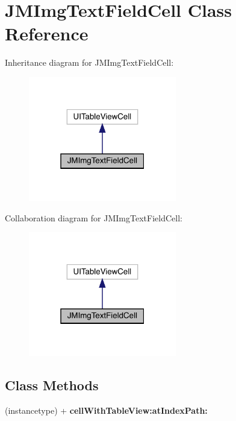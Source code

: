 \hypertarget{interface_j_m_img_text_field_cell}{}\section{J\+M\+Img\+Text\+Field\+Cell Class Reference}
\label{interface_j_m_img_text_field_cell}


Inheritance diagram for J\+M\+Img\+Text\+Field\+Cell\+:\nopagebreak
\begin{figure}[H]
\begin{center}
\leavevmode
\includegraphics[width=183pt]{interface_j_m_img_text_field_cell__inherit__graph}
\end{center}
\end{figure}


Collaboration diagram for J\+M\+Img\+Text\+Field\+Cell\+:\nopagebreak
\begin{figure}[H]
\begin{center}
\leavevmode
\includegraphics[width=183pt]{interface_j_m_img_text_field_cell__coll__graph}
\end{center}
\end{figure}
\subsection*{Class Methods}
\begin{DoxyCompactItemize}
\item 
\mbox{\label{interface_j_m_img_text_field_cell_aea05424686dd8d71e893ab0c342bee5b}} 
(instancetype) + {\bfseries cell\+With\+Table\+View\+:at\+Index\+Path\+:}
\end{DoxyCompactItemize}
